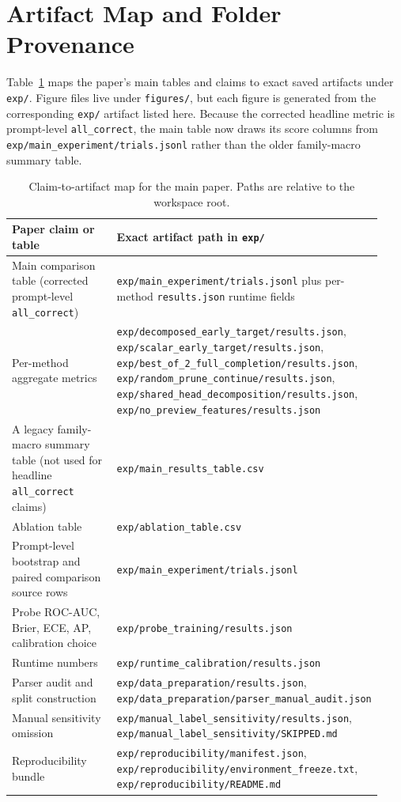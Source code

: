 \documentclass{article}
\begin{document}
\section{Artifact Map and Folder Provenance}
\label{app:artifacts}
Table~\ref{tab:artifact-map} maps the paper's main tables and claims to exact saved artifacts under \texttt{exp/}. Figure files live under \texttt{figures/}, but each figure is generated from the corresponding \texttt{exp/} artifact listed here. Because the corrected headline metric is prompt-level \texttt{all\_correct}, the main table now draws its score columns from \texttt{exp/main\_experiment/trials.jsonl} rather than the older family-macro summary table.

\begin{table}[t]
\caption{Claim-to-artifact map for the main paper. Paths are relative to the workspace root.}
\label{tab:artifact-map}
\centering
\small
\begin{tabular}{p{0.39\linewidth}p{0.54\linewidth}}
\toprule
Paper claim or table & Exact artifact path in \texttt{exp/} \\
\midrule
Main comparison table (corrected prompt-level \texttt{all\_correct}) & \texttt{exp/main\_experiment/trials.jsonl} plus per-method \texttt{results.json} runtime fields \\
Per-method aggregate metrics & \texttt{exp/decomposed\_early\_target/results.json}, \texttt{exp/scalar\_early\_target/results.json}, \texttt{exp/best\_of\_2\_full\_completion/results.json}, \texttt{exp/random\_prune\_continue/results.json}, \texttt{exp/shared\_head\_decomposition/results.json}, \texttt{exp/no\_preview\_features/results.json} \\
A legacy family-macro summary table (not used for headline \texttt{all\_correct} claims) & \texttt{exp/main\_results\_table.csv} \\
Ablation table & \texttt{exp/ablation\_table.csv} \\
Prompt-level bootstrap and paired comparison source rows & \texttt{exp/main\_experiment/trials.jsonl} \\
Probe ROC-AUC, Brier, ECE, AP, calibration choice & \texttt{exp/probe\_training/results.json} \\
Runtime numbers & \texttt{exp/runtime\_calibration/results.json} \\
Parser audit and split construction & \texttt{exp/data\_preparation/results.json}, \texttt{exp/data\_preparation/parser\_manual\_audit.json} \\
Manual sensitivity omission & \texttt{exp/manual\_label\_sensitivity/results.json}, \texttt{exp/manual\_label\_sensitivity/SKIPPED.md} \\
Reproducibility bundle & \texttt{exp/reproducibility/manifest.json}, \texttt{exp/reproducibility/environment\_freeze.txt}, \texttt{exp/reproducibility/README.md} \\
\bottomrule
\end{tabular}
\end{table}
\end{document}
